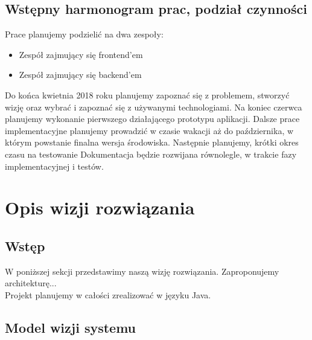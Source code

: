 \documentclass[12pt,a4paper]{report}
\begin{document}


\subsection{Wstępny harmonogram prac, podział czynności}

Prace planujemy podzielić na dwa zespoły:
\begin{itemize}
\item Zespół zajmujący się frontend'em
\item Zespół zajmujący się backend'em
\end{itemize}

Do końca kwietnia 2018 roku planujemy zapoznać się z problemem, stworzyć wizję oraz wybrać i zapoznać się z używanymi technologiami. Na koniec czerwca planujemy wykonanie pierwszego działającego prototypu aplikacji. Dalsze prace implementacyjne planujemy prowadzić w czasie wakacji aż do października, w którym powstanie finalna wersja środowiska. Następnie planujemy, krótki okres czasu na testowanie  Dokumentacja będzie rozwijana równolegle, w trakcie fazy implementacyjnej i testów.

\newpage
\section{Opis wizji rozwiązania}

\subsection{Wstęp}

W poniższej sekcji przedstawimy naszą wizję rozwiązania. Zaproponujemy architekturę...\\
Projekt planujemy w całości zrealizować w języku Java.


\subsection{Model wizji systemu}
\end{document}

